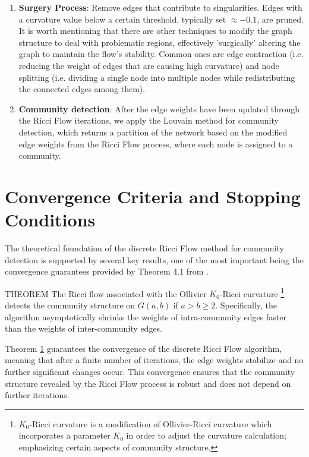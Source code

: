 \begin{enumerate}
    \item \textbf{Surgery Process}: Remove edges that contribute to singularities. Edges with a curvature value below a certain threshold, typically set $\approx -0.1$, are pruned. It is worth mentioning that there are other techniques to modify the graph structure to deal with problematic regions, effectively 'surgically' altering the graph to maintain the flow's stability. Common ones are edge contraction (i.e. reducing the weight of edges that are causing high curvature) and node splitting (i.e. dividing a single node into multiple nodes while redistributing the connected edges among them).
    

    \item \textbf{Community detection}: After the edge weights have been updated through the Ricci Flow iterations, we apply the Louvain method for community detection, which returns a partition of the network based on the modified edge weights from the Ricci Flow process, where each node is assigned to a community.  
\end{enumerate}



\section{Convergence Criteria and Stopping Conditions} \label{sec2.3}
The theoretical foundation of the discrete Ricci Flow method for community detection is supported by several key results, one of the most important being the convergence guarantees provided by Theorem 4.1 from \cite{communitydetectionnetworksricci}.

\color{red}THEOREM\color{black}
The Ricci flow associated with the Ollivier $K_0$-Ricci curvature \footnote{$K_0$-Ricci curvature is a modification of Ollivier-Ricci curvature which incorporates a parameter $K_0$ in order to adjust the curvature calculation; emphasizing certain aspects of community structure.} detects the community structure on $G(a, b)$ if $a > b \geq 2$. Specifically, the algorithm asymptotically shrinks the weights of intra-community edges faster than the weights of inter-community edges. %

Theorem \hyperref[th1]{1} guarantees the convergence of the discrete Ricci Flow algorithm, meaning that after a finite number of iterations, the edge weights stabilize and no further significant changes occur. This convergence ensures that the community structure revealed by the Ricci Flow process is robust and does not depend on further iterations.

